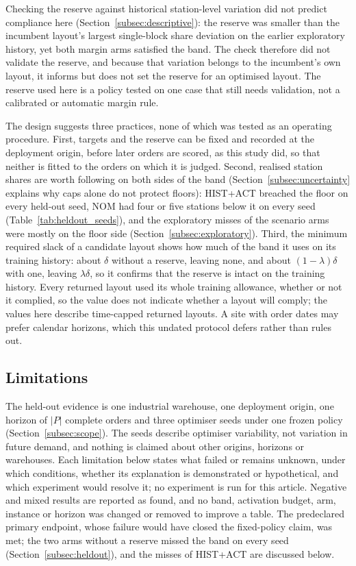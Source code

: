 Checking the reserve against historical station-level variation did not predict compliance here (Section~\ref{subsec:descriptive}): the reserve was smaller than the incumbent layout's largest single-block share deviation on the earlier exploratory history, yet both margin arms satisfied the band. The check therefore did not validate the reserve, and because that variation belongs to the incumbent's own layout, it informs but does not set the reserve for an optimised layout. The reserve used here is a policy tested on one case that still needs validation, not a calibrated or automatic margin rule.

The design suggests three practices, none of which was tested as an operating procedure. First, targets and the reserve can be fixed and recorded at the deployment origin, before later orders are scored, as this study did, so that neither is fitted to the orders on which it is judged. Second, realised station shares are worth following on both sides of the band (Section~\ref{subsec:uncertainty} explains why caps alone do not protect floors): HIST+ACT breached the floor on every held-out seed, NOM had four or five stations below it on every seed (Table~\ref{tab:heldout_seeds}), and the exploratory misses of the scenario arms were mostly on the floor side (Section~\ref{subsec:exploratory}). Third, the minimum required slack of a candidate layout shows how much of the band it uses on its training history: about $\delta$ without a reserve, leaving none, and about $(1-\lambda)\delta$ with one, leaving $\lambda\delta$, so it confirms that the reserve is intact on the training history. Every returned layout used its whole training allowance, whether or not it complied, so the value does not indicate whether a layout will comply; the values here describe time-capped returned layouts. A site with order dates may prefer calendar horizons, which this undated protocol defers rather than rules out.

\subsection{Limitations}\label{subsec:limitations}
The held-out evidence is one industrial warehouse, one deployment origin, one horizon of $|P|$ complete orders and three optimiser seeds under one frozen policy (Section~\ref{subsec:scope}). The seeds describe optimiser variability, not variation in future demand, and nothing is claimed about other origins, horizons or warehouses. Each limitation below states what failed or remains unknown, under which conditions, whether its explanation is demonstrated or hypothetical, and which experiment would resolve it; no experiment is run for this article. Negative and mixed results are reported as found, and no band, activation budget, arm, instance or horizon was changed or removed to improve a table. The predeclared primary endpoint, whose failure would have closed the fixed-policy claim, was met; the two arms without a reserve missed the band on every seed (Section~\ref{subsec:heldout}), and the misses of HIST+ACT are discussed below.

